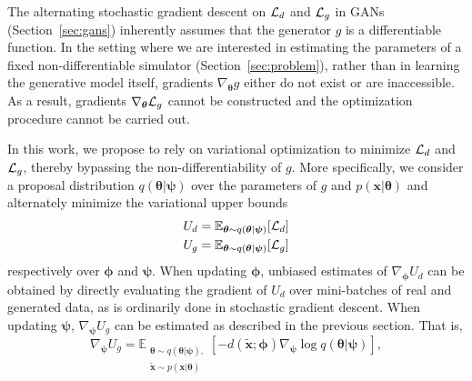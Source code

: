 \documentclass[twocolumn,superscriptaddress,aps]{revtex4-1}
\newcommand{\bftheta}{{\bm \theta}}
\newcommand{\bfpsi}{{\bm \psi}}
\newcommand{\bfphi}{{\bm \phi}}
\newcommand{\bfx}{\mathbf{x}}
\newcommand{\bfz}{\mathbf{z}}
\theoremstyle{plain}
\begin{document}
The alternating stochastic gradient descent on ${\cal L}_d$ and ${\cal L}_g$ in
GANs (Section~\ref{sec:gans}) inherently assumes that the generator $g$ is a differentiable function. In
the setting where we are interested in estimating the parameters of a
fixed non-differentiable simulator (Section~\ref{sec:problem}),
rather than in learning the generative model itself,
gradients $\nabla_\bftheta g$ either do not exist or are inaccessible. As a
result, gradients $\nabla_\bftheta {\cal L}_g$ cannot be constructed and the
optimization procedure cannot be carried out.

In this work, we propose to rely on variational optimization to minimize ${\cal
L}_d$ and ${\cal L}_g$, thereby bypassing the non-differentiability of $g$. More
specifically, we consider a proposal distribution $q(\bftheta|\bfpsi)$ over the
parameters of $g$ and $p(\mathbf{x}|\bftheta)$ and alternately minimize the variational upper bounds
\begin{align}
    U_d &= \mathbb{E}_{\bftheta \sim q(\bftheta|\bfpsi)} [ {\cal L}_d ] \label{eqn:vo-ud} \\
    U_g &= \mathbb{E}_{\bftheta \sim q(\bftheta|\bfpsi)} [ {\cal L}_g ] \label{eqn:vo-ug}
\end{align} respectively over $\bfphi$ and $\bfpsi$.
When updating
$\bfphi$, unbiased estimates of $\nabla_\bfphi U_d$ can be obtained by
directly evaluating the gradient of $U_d$ over mini-batches of real and
generated data, as is ordinarily done in stochastic gradient descent. When updating
$\bfpsi$, $\nabla_\bfpsi U_g$ can be estimated as described in the previous section.
That is,
\begin{equation}\label{eqn:grad-ug-approx}
   \nabla_\bfpsi U_g = \mathbb{E}_{\substack{\bftheta \sim q(\bftheta|\bfpsi), \\ \tilde{\bfx} \sim p(\bfx | \bftheta)}}  [-d( \tilde{\bfx} ;\bfphi) \nabla_\bfpsi \log q(\bftheta|\bfpsi)],
\end{equation}
\end{document}
